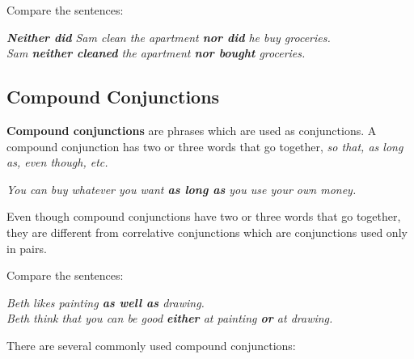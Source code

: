 \documentclass[hidelinks,10pt,a4paper]{article}
\begin{document}
Compare the sentences:

\begin{center}
	\textit{\textbf{Neither did} Sam clean the apartment \textbf{nor did} he buy groceries.\\
	Sam \textbf{neither cleaned} the apartment \textbf{nor bought} groceries.}
\end{center}

\subsection{Compound Conjunctions}
\textbf{Compound conjunctions} are phrases which are used as conjunctions. A compound conjunction has two or three words that go together, \textit{so that, as long as, even though, etc.}

\begin{center}
	\textit{You can buy whatever you want \textbf{as long as} you use your own money.}
\end{center}

Even though compound conjunctions have two or three words that go together, they are different from correlative conjunctions which are conjunctions used only in pairs.

Compare the sentences:

\begin{center}
	\textit{Beth likes painting \textbf{as well as} drawing.\\
	Beth think that you can be good \textbf{either} at painting \textbf{or} at drawing.}
\end{center}

There are several commonly used compound conjunctions:
\end{document}
